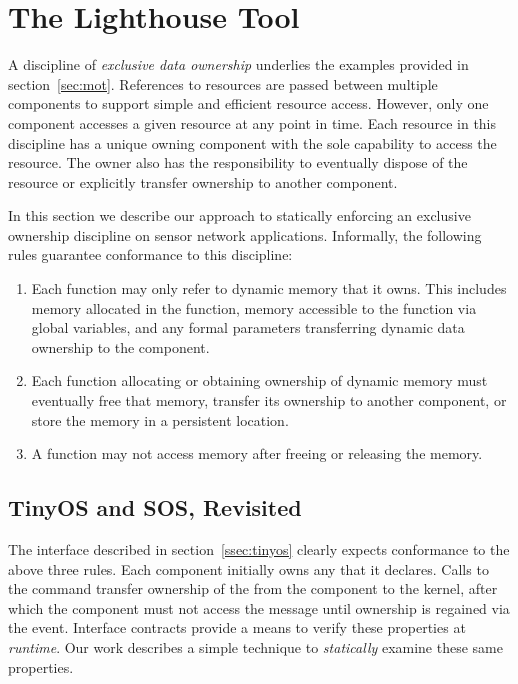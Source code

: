 \section{The Lighthouse Tool}
\label{sec:alg}



A discipline of {\em exclusive data ownership} underlies the examples
provided in section~\ref{sec:mot}.
%
References to resources are passed between multiple components to support
simple and efficient resource access.
%
However, only one component accesses a given resource at any point in time.
%
Each resource in this discipline has a unique owning component with the sole
capability to access the resource.
%
The owner also has the responsibility to eventually dispose of the resource or
explicitly transfer ownership to another component.



In this section we describe our approach to statically enforcing an exclusive
ownership discipline on sensor network applications.  
%
Informally, the following rules guarantee conformance to this discipline:
%
\begin{enumerate}
%
\item Each function may only refer to dynamic memory that it owns.  This
includes memory allocated in the function, memory accessible to the function
via global variables, and any formal parameters transferring dynamic data ownership to
the component.
%
\item Each function allocating or obtaining ownership of dynamic memory must
eventually free that memory, transfer its ownership to another component, or
store the memory in a persistent location.
%
\item A function may not access memory after freeing or releasing the memory.
%
\end{enumerate}



\subsection{TinyOS and SOS, Revisited}



The  interface described in section~\ref{ssec:tinyos} clearly
expects conformance to the above three rules.
%
Each component initially owns any  that it declares.
%
Calls to the  command transfer ownership of the 
from the component to the kernel, after which the component must not access
the message until ownership is regained via the  event.
%
Interface contracts provide a means to verify these properties at {\em
runtime}.
%
Our work describes a simple technique to {\em statically} examine these same
properties.
 



